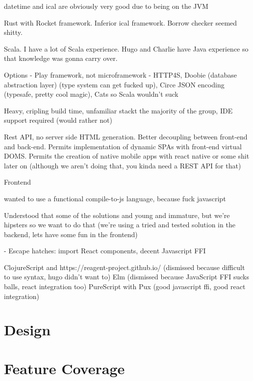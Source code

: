 \documentclass[11pt,a4paper]{report}
\begin{document}
datetime and ical are obviously very good due to being on the JVM


Rust with Rocket framework. Inferior ical framework. Borrow checker seemed shitty.

Scala. I have a lot of Scala experience. Hugo and Charlie have Java experience so that knowledge was gonna carry over.

Options - Play framework, not microframework
- HTTP4S, Doobie (database abstraction layer) (type system can get fucked up), Circe JSON encoding (typesafe, pretty cool magic), Cats so Scala wouldn't suck

Heavy, cripling build time, unfamiliar stackt the majority of the group, IDE support required (would rather not)




Rest API, no server side HTML generation. Better decoupling between front-end and back-end. Permits implementation of dynamic SPAs with front-end virtual DOMS. Permits the creation of native mobile apps with react native or some shit later on (although we aren't doing that, you kinda need a REST API for that)

Frontend

wanted to use a functional compile-to-js language, because fuck javascript

Understood that some of the solutions and young and immature, but we're hipsters so we want to do that (we're using a tried and tested solution in the backend, lets have some fun in the frontend)

- Escape hatches: import React components, decent Javascript FFI

ClojureScript and https://reagent-project.github.io/ (dismissed because difficult to use syntax, hugo didn't want to)
Elm (dismissed because JavaScript FFI sucks balls, react integration too)
PureScript with Pux (good javascript ffi, good react integration)


\chapter{Design}

\chapter{Feature Coverage}



\end{document}

